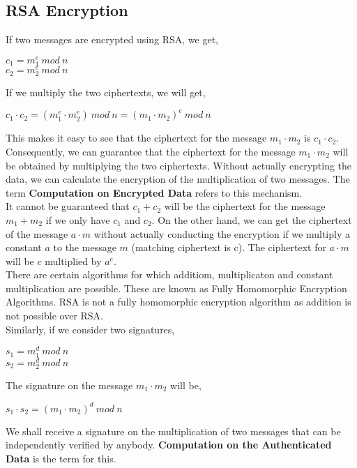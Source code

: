 \documentclass[11pt]{article}
\begin{document}
\subsection{RSA Encryption}
If two messages are encrypted using RSA, we get,
\begin{center}
    $c_1 = m_1^e \ mod \ n$\\
    $c_2 = m_2^e \ mod \ n$
\end{center}
If we multiply the two ciphertexts, we will get,
\begin{center}
    $c_1 \cdot c_2 = (m_1^e \cdot m_2^e) \ mod \ n = {(m_1 \cdot m_2)}^e \ mod \ n$
\end{center}
This makes it easy to see that the ciphertext for the message $m_1 \cdot m_2$ is $c_1 \cdot c_2$. Consequently, we can guarantee that the ciphertext for the message $m_1 \cdot m_2$ will be obtained by multiplying the two ciphertexts. Without actually encrypting the data, we can calculate the encryption of the multiplication of two messages. The term \textbf{Computation on Encrypted Data} refers to this mechanism.\\
\newline
It cannot be guaranteed that $c_1 + c_2$ will be the ciphertext for the message $m_1 + m_2$ if we only have $c_1$ and $c_2$. On the other hand, we can get the ciphertext of the message $a \cdot m$ without actually conducting the encryption if we multiply a constant $a$ to the message $m$ (matching ciphertext is c). The ciphertext for $a\cdot m$ will be $c$ multiplied by $a^e$.\\
\newline
There are certain algorithms for which additiom, multiplicaton and constant multiplication are possible. These are known as Fully Homomorphic Encryption Algorithms. RSA is not a fully homomorphic encryption algorithm as addition is not possible over RSA.\\
\newline
Similarly, if we consider two signatures,
\begin{center}
    $s_1 = m_1^d \ mod \ n$\\
    $s_2 = m_2^d \ mod \ n$
\end{center}
The signature on the message $m_1 \cdot m_2$ will be,
\begin{center}
    $s_1 \cdot s_2 = {(m_1 \cdot m_2)}^d \ mod \ n$
\end{center}
We shall receive a signature on the multiplication of two messages that can be independently verified by anybody. \textbf{Computation on the Authenticated Data} is the term for this.\\
\end{document}
